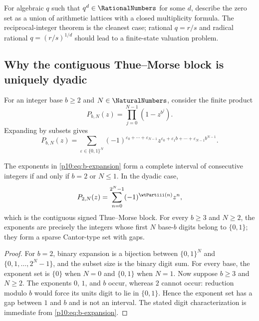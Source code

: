 \documentclass[11pt]{article}
\numberwithin{equation}{section}
\theoremstyle{definition}
\theoremstyle{remark}
\begin{document}
\begin{problem}
For algebraic $q$ such that $q^d\in\RationalNumbers$ for some $d$, describe the zero set as a union of
arithmetic lattices with a closed multiplicity formula.  The reciprocal-integer theorem is
the cleanest case; rational $q=r/s$ and radical rational $q=(r/s)^{1/d}$ should lead to a
finite-state valuation problem.
\end{problem}

\subsection{Why the contiguous Thue--Morse block is uniquely dyadic}

For an integer base $b\ge2$ and $N\in\NaturalNumbers$, consider the finite product
\begin{equation}
 P_{b,N}(z)=\prod_{j=0}^{N-1}(1-z^{b^j}).                    \label{p10:eq:b-product}
\end{equation}
Expanding by subsets gives
\begin{equation}
 P_{b,N}(z)
 =\sum_{\varepsilon\in\{0,1\}^N}
  (-1)^{\varepsilon_0+\cdots+\varepsilon_{N-1}}
  z^{\varepsilon_0+\varepsilon_1b+\cdots+\varepsilon_{N-1}b^{N-1}}. \label{p10:eq:b-expansion}
\end{equation}

\begin{proposition}
\label{p10:prop:dyadic-contiguity}
The exponents in \eqref{p10:eq:b-expansion} form a complete interval of consecutive integers if
and only if $b=2$ or $N\le1$.  In the dyadic case,
\begin{equation}
 P_{2,N}(z)=\sum_{n=0}^{2^N-1}(-1)^{\wtPartiii(n)}z^n,              \label{p10:eq:tm-block}
\end{equation}
which is the contiguous signed Thue--Morse block.  For every $b\ge3$ and $N\ge2$, the
exponents are precisely the integers whose first $N$ base-$b$ digits belong to $\{0,1\}$;
they form a sparse Cantor-type set with gaps.
\end{proposition}

\begin{proof}
For $b=2$, binary expansion is a bijection between $\{0,1\}^N$ and
$\{0,1,\ldots,2^N-1\}$, and the subset size is the binary digit sum.  For every base, the
exponent set is $\{0\}$ when $N=0$ and $\{0,1\}$ when $N=1$.  Now suppose $b\ge3$ and
$N\ge2$.  The exponents $0$, $1$, and $b$ occur, whereas $2$ cannot occur: reduction modulo
$b$ would force its units digit to lie in $\{0,1\}$.  Hence the exponent set has a gap
between $1$ and $b$ and is not an interval.  The stated digit characterization is immediate
from \eqref{p10:eq:b-expansion}.
\end{proof}
\end{document}
